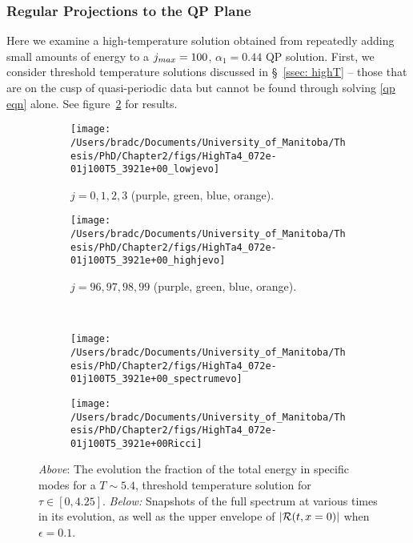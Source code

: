 \documentclass[../PhD.tex]{subfiles}
\begin{document}

\subsubsection{Regular Projections to the QP Plane}
\label{sssec: evo of regular projections}

Here we examine a high-temperature solution obtained from repeatedly adding small amounts of energy to a $j_{max} = 100$, $\alpha_1 = 0.44$ QP solution. First, we consider threshold temperature solutions discussed in \S~\!\ref{ssec: highT} -- those that are on the cusp of quasi-periodic data but cannot be found through solving \eqref{qp eqn} alone. See figure~\ref{fig:HighTa4_072e-01j100T5_3921e+00_evo} for results.

\begin{figure}[h]
	\centering
	\begin{subfigure}[t]{0.48\textwidth}
		\texttt{[image: /Users/bradc/Documents/University\_of\_Manitoba/Thesis/PhD/Chapter2/figs/HighTa4\_072e-01j100T5\_3921e+00\_lowjevo]}
		\caption{$j = 0, 1, 2, 3$ (purple, green, blue, orange).}
	\end{subfigure}
	\;
	\begin{subfigure}[t]{0.48\textwidth}
		\texttt{[image: /Users/bradc/Documents/University\_of\_Manitoba/Thesis/PhD/Chapter2/figs/HighTa4\_072e-01j100T5\_3921e+00\_highjevo]}
		\caption{$j=96, 97, 98, 99$ (purple, green, blue, orange).}
		\label{fig: HighTa4_072e-01j100T5_3921e+00_highjevo}
	\end{subfigure}
	\\
	\begin{subfigure}[t]{0.48\textwidth}
		\texttt{[image: /Users/bradc/Documents/University\_of\_Manitoba/Thesis/PhD/Chapter2/figs/HighTa4\_072e-01j100T5\_3921e+00\_spectrumevo]}
	\end{subfigure}
	\quad
	\begin{subfigure}[t]{0.48\textwidth}
		\texttt{[image: /Users/bradc/Documents/University\_of\_Manitoba/Thesis/PhD/Chapter2/figs/HighTa4\_072e-01j100T5\_3921e+00Ricci]}
	\end{subfigure}
	\caption[Examining the energy per mode during the evolution of a threshold temperature solution]{{\it Above}: The evolution the fraction of the total energy in specific modes for a $T \sim 5.4$, threshold temperature solution for $\tau \in [0, 4.25]$. {\it Below:} Snapshots of the full spectrum at various times in its evolution, as well as the upper envelope of $| \mathcal R(t,x=0)|$ when $\epsilon = 0.1$.}
	\label{fig:HighTa4_072e-01j100T5_3921e+00_evo}
\end{figure}
\end{document}
